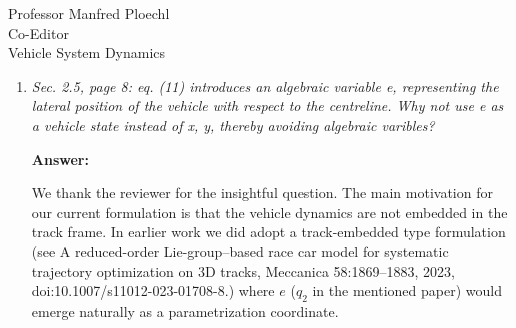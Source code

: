 \documentclass{letter}
\begin{document}
\begin{letter}{Professor Manfred Ploechl\\
Co-Editor\\
Vehicle System Dynamics}
\begin{enumerate}
\vspace{4pt} 
Given force references $(F_x^{\mathrm{ref}},F_y^{\mathrm{ref}})$ produced at the generic iteration of the NLP solver, we could define the instantaneous directional limits from the MF model at the current $(\alpha,\kappa)$:
\begin{equation}
F_{x,\lim} \;=\; D_x\,G_{xa}(\alpha,\kappa,\ldots),
\qquad
F_{y,\lim} \;=\; D_y\,G_{yk}(\alpha,\kappa,\ldots).
\label{eq:limits}
\end{equation}
Of course, since $SV_{yk}$ is an offset, we could work with the lateral \emph{effective} command $F_{y,\mathrm{eff}}^{\mathrm{ref}} := F_y^{\mathrm{ref}} - SV_{yk}$.
Then the new \emph{axle saturation ratio} $S$ would read
\begin{equation}
S=
\left(\frac{F_x^{\mathrm{ref}}}{F_{x,\lim}}\right)^2
+
\left(\frac{F_{y,\mathrm{eff}}^{\mathrm{ref}}}{F_{y,\lim}}\right)^2,
\label{eq:util}
\end{equation}
and robustness to friction uncertainty would be enforced by the same considerations that have been proposed in Sec. 2.4 of the paper.
It is worth observing that this \emph{breathing ellipse} would not add additional physics: the MF already encodes tyre coupling. It would just provide a control–level robustness margin in analogy to the classical friction‐ellipse constraint, but \emph{coherent} with the instantaneous MF capacities $D\,G$ (and with $SV_{yk}$ excluded from the lateral capacity).
 
\hrulefill

\item
\textit{Sec. 2.5, page 8: eq. (11) introduces an algebraic variable e, representing the lateral position of the vehicle with respect to the centreline. Why not use e as a vehicle state instead of x, y, thereby avoiding algebraic varibles?}

\vspace{2mm}

\textbf{Answer:}

We thank the reviewer for the insightful question. The main motivation for our current formulation is that the vehicle dynamics are not embedded in the track frame. In earlier work we did adopt a track-embedded type formulation (see A reduced-order Lie-group–based race car model for systematic trajectory optimization on 3D tracks, Meccanica 58:1869–1883, 2023, doi:10.1007/s11012-023-01708-8.) where $e$ ($q_2$ in the mentioned paper) would emerge naturally as a parametrization coordinate.


\end{enumerate}
\end{letter}
\end{document}
